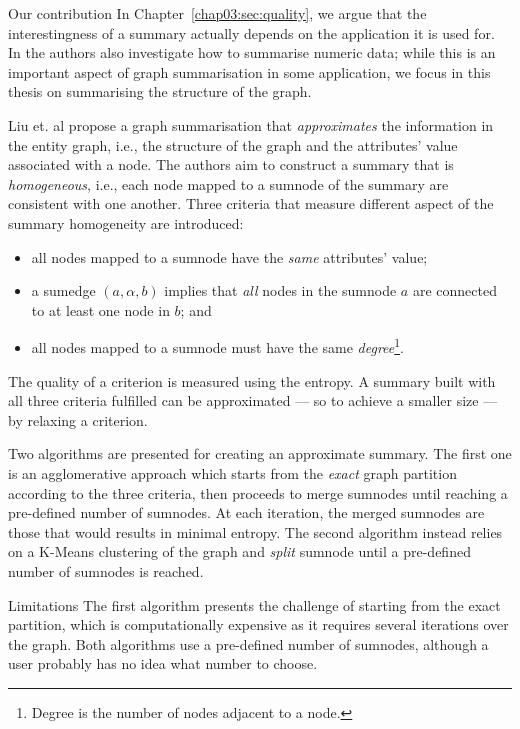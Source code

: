 \begin{centeremph}{Our contribution}
In Chapter~\ref{chap03:sec:quality}, we argue that the interestingness of a summary actually depends on the application it is used for. In \cite{zhang:2010:ddg} the authors also investigate how to summarise numeric data; while this is an important aspect of graph summarisation in some application, we focus in this thesis on summarising the structure of the graph.
\end{centeremph}

Liu et. al \cite{zheng:ipsj:2011} propose a graph summarisation that \emph{approximates} the information in the entity graph, i.e., the structure of the graph and the attributes' value associated with a node. The authors aim to construct a summary that is \emph{homogeneous}, i.e., each node mapped to a sumnode of the summary are consistent with one another. Three criteria that measure different aspect of the summary homogeneity are introduced:
\begin{itemize}
	\item all nodes mapped to a sumnode have the \emph{same} attributes' value;
	\item a sumedge $(a,\alpha,b)$ implies that \emph{all} nodes in the sumnode $a$ are connected to at least one node in $b$; and
	\item all nodes mapped to a sumnode must have the same \emph{degree}\footnote{Degree is the number of nodes adjacent to a node.}.
\end{itemize}
The quality of a criterion is measured using the entropy. A summary built with all three criteria fulfilled can be approximated --- so to achieve a smaller size --- by relaxing a criterion.

Two algorithms are presented for creating an approximate summary. The first one is an agglomerative approach which starts from the \emph{exact} graph partition according to the three criteria, then proceeds to merge sumnodes until reaching a pre-defined number of sumnodes. At each iteration, the merged sumnodes are those that would results in minimal entropy. The second algorithm instead relies on a K-Means clustering of the graph and \emph{split} sumnode until a pre-defined number of sumnodes is reached.

\begin{centeremph}{Limitations}
	The first algorithm presents the challenge of starting from the exact partition, which is computationally expensive as it requires several iterations over the graph. Both algorithms use a pre-defined number of sumnodes, although a user probably has no idea what number to choose.
\end{centeremph}


